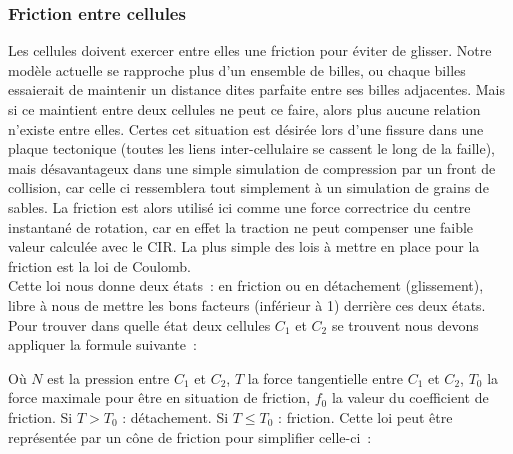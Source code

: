 \documentclass[a4paper,11pt]{article}
\begin{document}
\subsubsection{Friction entre cellules}
Les cellules doivent exercer entre elles une friction pour éviter de glisser.
Notre modèle actuelle se rapproche plus d'un ensemble de billes, ou chaque billes essaierait de maintenir un distance dites parfaite entre ses billes adjacentes.
Mais si ce maintient entre deux cellules ne peut ce faire, alors plus aucune relation n'existe entre elles.
Certes cet situation est désirée lors d'une fissure dans une plaque tectonique (toutes les liens inter-cellulaire se cassent le long de la faille), mais désavantageux dans une simple simulation de compression par un front de collision, car celle ci ressemblera tout simplement à un simulation de grains de sables.
La friction est alors utilisé ici comme une force correctrice du centre instantané de rotation, car en effet la traction ne peut compenser une faible valeur calculée avec le CIR.
La plus simple des lois à mettre en place pour la friction est la loi de Coulomb. \\
Cette loi nous donne deux états~: en friction ou en détachement (glissement), libre à nous de mettre les bons facteurs (inférieur à 1) derrière ces deux états.
Pour trouver dans quelle état deux cellules $C_1$ et $C_2$ se trouvent nous devons appliquer la formule suivante~:
\begin{center}
\end{center}
\bigbreak
Où $N$ est la pression entre $C_1$ et $C_2$, $T$ la force tangentielle entre $C_1$ et $C_2$, $T_0$ la force maximale pour être en situation de friction, $f_0$ la valeur du coefficient de friction.
\medbreak
Si $T > T_0$ : détachement.
Si $T \leqslant T_0$ : friction.
\medbreak
Cette loi peut être représentée par un cône de friction pour simplifier celle-ci~: \\

\begin{center}
\end{center}
\end{document}

